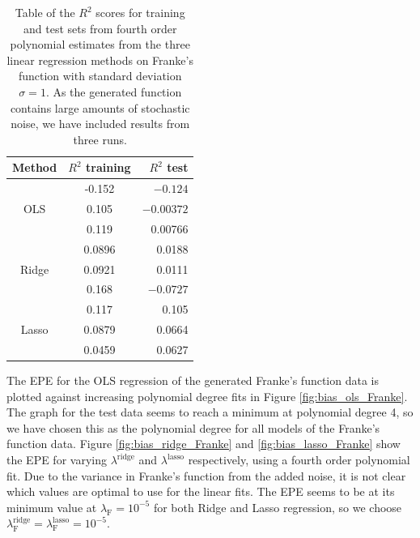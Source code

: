 \documentclass[a4paper, 10pt]{article}
\begin{document}
\begin{multicols}{2}
\begin{table}[H]
\caption{Table of the $R^2$ scores for training and test sets from fourth order polynomial estimates from  the three linear regression methods on Franke's function with standard deviation $\sigma=1$. As the generated function contains large amounts of stochastic noise, we have included results from three runs.\vspace{2pt}}

\label{tab:R2_stddev=1}
\centering
\begin{tabular}{|c|c|r|} \hline
Method & $R^2$ training & $R^2$ test \\ \hline
\multirow{3}{*}{OLS} & -0.152& $-0.124$\\
											& 0.105 & $-0.00372$ \\
											& 0.119   & 0.00766\\ \cline{1-3}
\multirow{3}{*}{Ridge} & 0.0896 & 0.0188\\
											& 0.0921   & 0.0111 \\
											& 0.168      & $-0.0727$\\ \cline{1-3}
\multirow{3}{*}{Lasso} & 0.117& 0.105\\
											& 0.0879   & 0.0664 \\
											& 0.0459 & 0.0627\\ \cline{1-3}
\end{tabular}
\end{table}

The EPE for the OLS regression of the generated Franke's function data is plotted against increasing polynomial degree fits in Figure \ref{fig:bias_ols_Franke}.  The graph for the test data seems to reach a minimum at polynomial degree 4, so we have chosen this as the polynomial degree for all models of the Franke's function data. Figure \ref{fig:bias_ridge_Franke} and \ref{fig:bias_lasso_Franke} show the EPE for varying $\lambda^\text{ridge}$ and $\lambda^\text{lasso}$ respectively, using a fourth order polynomial fit. Due to the variance in Franke's function from the added  noise, it is not clear which values are optimal to use for the linear fits. The EPE seems to be at its minimum value at $\lambda_\text{F}=10^{-5}$ for both Ridge and Lasso regression, so we choose $\lambda^\text{ridge}_\text{F} = \lambda^\text{lasso}_\text{F}=10^{-5}$.





\end{multicols}
\end{document}
